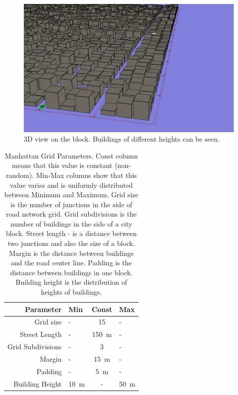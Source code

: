 \documentclass[]{nsm-thesis}
\begin{document}
\begin{figure}
	\centering
	\includegraphics[width=1\textwidth]{figures/GlobalView3D-Block.png}
	\caption{3D view on the block. Buildings of different heights can be seen.}
	\label{fig:manhattangrid3dblock}
\end{figure}

\begin{table}
    \centering
    \begin{tabular}{rlcl}
        \toprule
        Parameter & Min & Const & Max \\
        \midrule
        	Grid size & - & 15 & - \\
        	Street Length & - & \SI{150}{\meter} & - \\
		Grid Subdivisions & - & 3 & - \\
		Margin & - & \SI{15}{\meter} & - \\
		Padding & - & \SI{5}{\meter} & - \\
		Building Height & \SI{10}{\meter} & - & \SI{50}{\meter} \\
        \bottomrule
    \end{tabular}
    \caption{Manhattan Grid Parameters. Const column means that this value is constant (non-random). Min-Max columns show that this value varies and is uniformly distributed between Minimum and Maximum. Grid size is the number of junctions in the side of road network grid. Grid subdivisions is the number of buildings in the side of a city block. Street length - is a distance between two junctions and also the size of a block. Margin is the distance between buildings and the road center line. Padding is the distance between buildings in one block. Building height is the distribution of heights of buildings. }
    \label{tab:manhattangrid}
\end{table}
\end{document}
